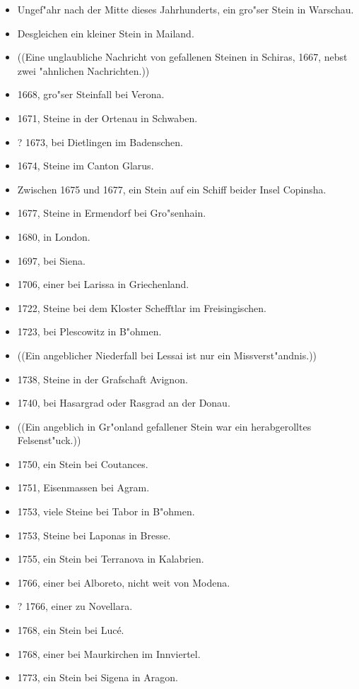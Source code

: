 \documentclass[a4paper, 11pt, oneside, polutonikogreek, german]{article}
\begin{document}
\begin{itemize}
    \item Ungef"ahr nach der Mitte dieses Jahrhunderts, ein gro"ser Stein in Warschau.
    \item Desgleichen ein kleiner Stein in Mailand.
    \item ((Eine unglaubliche Nachricht von gefallenen Steinen in Schiras, 1667, nebst zwei "ahnlichen Nachrichten.))
    \item 1668, gro"ser Steinfall bei Verona.
    \item 1671, Steine in der Ortenau in Schwaben.
    \item ? 1673, bei Dietlingen im Badenschen.
    \item 1674, Steine im Canton Glarus.
    \item Zwischen 1675 und 1677, ein Stein auf ein Schiff beider Insel Copinsha.
    \item 1677, Steine in Ermendorf bei Gro"senhain.
    \item 1680, in London.
    \item 1697, bei Siena.
    \item 1706, einer bei Larissa in Griechenland.
    \item 1722, Steine bei dem Kloster Schefftlar im Freisingischen.
    \item 1723, bei Plescowitz in B"ohmen.
    \item ((Ein angeblicher Niederfall bei Lessai ist nur ein Missverst"andnis.))
    \item 1738, Steine in der Grafschaft Avignon.
    \item 1740, bei Hasargrad oder Rasgrad an der Donau.
    \item ((Ein angeblich in Gr"onland gefallener Stein war ein herabgerolltes Felsenst"uck.))
    \item 1750, ein Stein bei Coutances.
    \item 1751, Eisenmassen bei Agram.
    \item 1753, viele Steine bei Tabor in B"ohmen.
    \item 1753, Steine bei Laponas in Bresse.
    \item 1755, ein Stein bei Terranova in Kalabrien.
    \item 1766, einer bei Alboreto, nicht weit von Modena.
    \item ? 1766, einer zu Novellara.
    \item 1768, ein Stein bei Lucé.
    \item 1768, einer bei Maurkirchen im Innviertel.
    \item 1773, ein Stein bei Sigena in Aragon.

\end{itemize}
\end{document}
